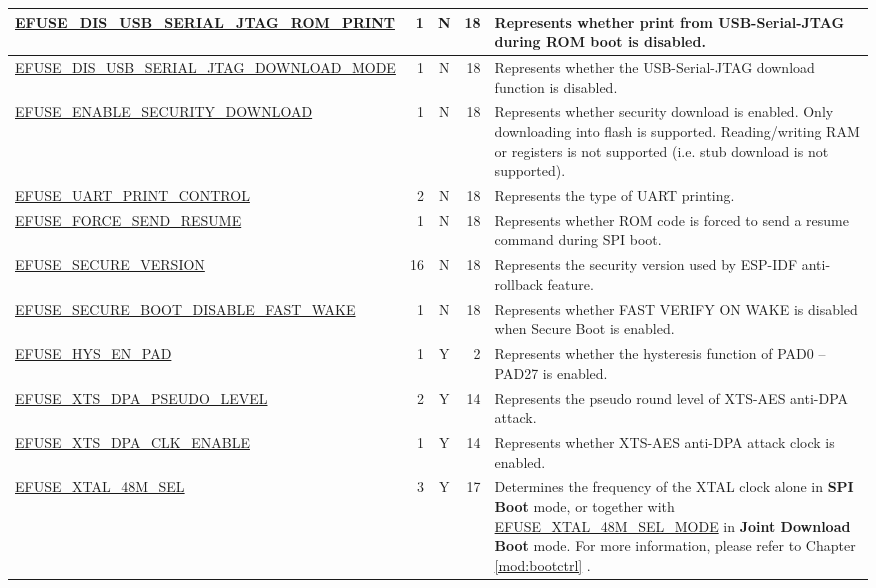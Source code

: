 \begin{longtable}[l]{ |m{8.2cm}|r|c|r|m{9cm}| }
    \hline
    \hyperref[fielddesc:EFUSEDISUSBSERIALJTAGROMPRINT]{EFUSE\_DIS\_USB\_SERIAL\_JTAG\_ROM\_PRINT} & 1 & N & 18 & Represents whether print from USB-Serial-JTAG during ROM boot is disabled.\\
    \hline
    \hyperref[fielddesc:EFUSEDISUSBSERIALJTAGDOWNLOADMODE]{EFUSE\_DIS\_USB\_SERIAL\_JTAG\_DOWNLOAD\_MODE} & 1 & N & 18 & Represents whether the USB-Serial-JTAG download function is disabled.\\
    \hline
    \hyperref[fielddesc:EFUSEENABLESECURITYDOWNLOAD]{EFUSE\_ENABLE\_SECURITY\_DOWNLOAD} & 1 & N & 18 & Represents whether security download is enabled. Only downloading into flash is supported. Reading/writing RAM or registers is not supported (i.e. stub download is not supported).\\
    \hline
    \hyperref[fielddesc:EFUSEUARTPRINTCONTROL]{EFUSE\_UART\_PRINT\_CONTROL} & 2 & N & 18 & Represents the type of UART printing.\\
    \hline
    \hyperref[fielddesc:EFUSEFORCESENDRESUME]{EFUSE\_FORCE\_SEND\_RESUME} & 1 & N & 18 & Represents whether ROM code is forced to send a resume command during SPI boot.\\
    \hline
    \hyperref[fielddesc:EFUSESECUREVERSION]{EFUSE\_SECURE\_VERSION} & 16 & N & 18 & Represents the security version used by ESP-IDF anti-rollback feature.\\
    \hline
    \hyperref[fielddesc:EFUSESECUREBOOTDISABLEFASTWAKE]{EFUSE\_SECURE\_BOOT\_DISABLE\_FAST\_WAKE} & 1 & N & 18 & Represents whether FAST VERIFY ON WAKE is disabled when Secure Boot is enabled.\\
    \hline
    \hyperref[fielddesc:EFUSEHYSENPAD]{EFUSE\_HYS\_EN\_PAD} & 1 & Y & 2 & Represents whether the hysteresis function of PAD0 – PAD27 is enabled.\\
    \hline
    \hyperref[fielddesc:EFUSEXTSDPAPSEUDOLEVEL]{EFUSE\_XTS\_DPA\_PSEUDO\_LEVEL} & 2 & Y & 14 & Represents the pseudo round level of XTS-AES anti-DPA attack.\\
    \hline
    \hyperref[fielddesc:EFUSEXTSDPACLKENABLE]{EFUSE\_XTS\_DPA\_CLK\_ENABLE} & 1 & Y & 14 & Represents whether XTS-AES anti-DPA attack clock is enabled.\\
    \hline
    \hyperref[fielddesc:EFUSEXTAL48MSEL]{EFUSE\_XTAL\_48M\_SEL} &  3 & Y & 17 & Determines the frequency of the XTAL clock alone in \textbf{SPI Boot} mode, or together with \hyperref[fielddesc:EFUSEXTAL48MSELMODE]{EFUSE\_XTAL\_48M\_SEL\_MODE} in \textbf{Joint Download Boot} mode. For more information, please refer to Chapter \ref{mod:bootctrl} \textit{\nameref{mod:bootctrl}}.\\

\end{longtable}
